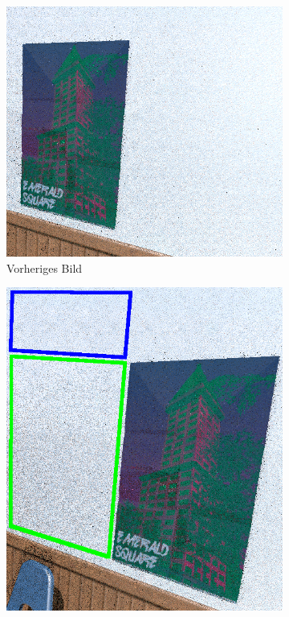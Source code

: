 \begin{figure}[H]
    \centering
    \begin{subfigure}{0.5\textwidth}
        \centering\includegraphics[width=\linewidth]{content/TemporalerAlg/Bilder/Sorting/vor_verschiebung.png} 
        \caption{Vorheriges Bild}
        \label{fig:Histogramm_Previous}
    \end{subfigure}
    \centering
    \begin{subfigure}{0.4\textwidth}
        \centering\includegraphics[width=\linewidth]{content/TemporalerAlg/Bilder/Sorting/nach_verschiebung.png}

\end{subfigure}
\end{figure}

